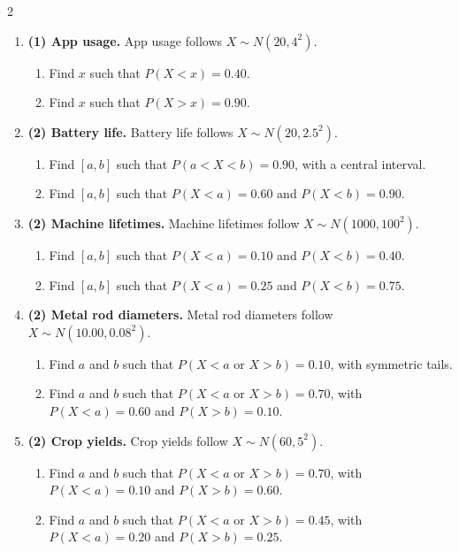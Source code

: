 \begin{multicols}{2}
\begin{enumerate}[label=\textbf{\arabic*)}]
\begin{enumerate}[label=\textbf{\alph*)}]
        \item Find \(x\) such that \(P(X<x)=0.70\).
    \end{enumerate}
    \item \textbf{(1) App usage.} App usage follows \(X\sim N(20,4^2)\).
    \begin{enumerate}[label=\textbf{\alph*)}]
        \item Find \(x\) such that \(P(X<x)=0.40\).
        \item Find \(x\) such that \(P(X>x)=0.90\).
    \end{enumerate}
    \item \textbf{(2) Battery life.} Battery life follows \(X\sim N(20,2.5^2)\).
    \begin{enumerate}[label=\textbf{\alph*)}]
        \item Find \([a,b]\) such that \(P(a<X<b)=0.90\), with a central interval.
        \item Find \([a,b]\) such that \(P(X<a)=0.60\) and \(P(X<b)=0.90\).
    \end{enumerate}
    \item \textbf{(2) Machine lifetimes.} Machine lifetimes follow \(X\sim N(1000,100^2)\).
    \begin{enumerate}[label=\textbf{\alph*)}]
        \item Find \([a,b]\) such that \(P(X<a)=0.10\) and \(P(X<b)=0.40\).
        \item Find \([a,b]\) such that \(P(X<a)=0.25\) and \(P(X<b)=0.75\).
    \end{enumerate}
    \item \textbf{(2) Metal rod diameters.} Metal rod diameters follow \(X\sim N(10.00,0.08^2)\).
    \begin{enumerate}[label=\textbf{\alph*)}]
        \item Find \(a\) and \(b\) such that \(P(X<a\text{ or }X>b)=0.10\), with symmetric tails.
        \item Find \(a\) and \(b\) such that \(P(X<a\text{ or }X>b)=0.70\), with \(P(X<a)=0.60\) and \(P(X>b)=0.10\).
    \end{enumerate}
    \item \textbf{(2) Crop yields.} Crop yields follow \(X\sim N(60,5^2)\).
    \begin{enumerate}[label=\textbf{\alph*)}]
        \item Find \(a\) and \(b\) such that \(P(X<a\text{ or }X>b)=0.70\), with \(P(X<a)=0.10\) and \(P(X>b)=0.60\).
        \item Find \(a\) and \(b\) such that \(P(X<a\text{ or }X>b)=0.45\), with \(P(X<a)=0.20\) and \(P(X>b)=0.25\).
    \end{enumerate}
\end{enumerate}

\end{multicols}


